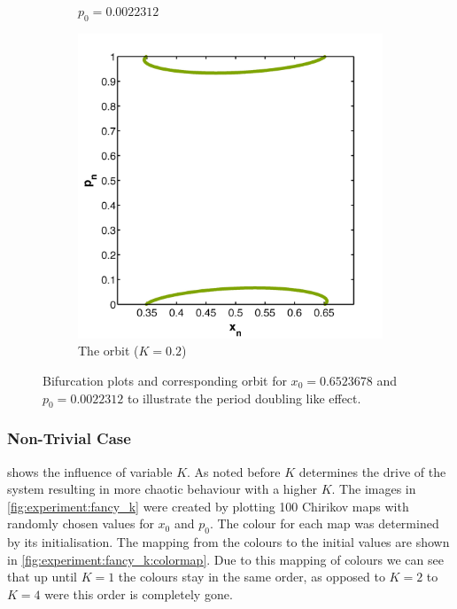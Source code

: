 \begin{figure}[ht]
\begin{subfigure}{0.32\textwidth}
			\caption{$p_0 = \num{0.0022312}$}
			\label{fig:experiment:bifurcation:p}
	\end{subfigure}
	\begin{subfigure}{0.32\textwidth}
		\centering
			\includegraphics[width=\textwidth]{./img/assignment_b_bfp_orbit}
			\caption{The orbit ($K = 0.2$)}
			\label{fig:experiment:bifurcation:orbit}
	\end{subfigure}
	\caption{Bifurcation plots and corresponding orbit for $x_0 = \num{0.6523678}$ and $p_0 = \num{0.0022312}$ to illustrate the period doubling like effect.}
	\label{fig:experiment:bifurcation}
\end{figure}

\subsubsection{Non-Trivial Case}
\label{ss:b:nontrivial}
 shows the influence of variable $K$. As noted before $K$ determines the drive of the system resulting in more chaotic behaviour with a higher $K$. The images in \cref{fig:experiment:fancy_k} were created by plotting 100 Chirikov maps with randomly chosen values for $x_0$ and $p_0$. The colour for each map was determined by its initialisation. The mapping from the colours to the initial values are shown in \cref{fig:experiment:fancy_k:colormap}. Due to this mapping of colours we can see that up until $K = 1$ the colours stay in the same order, as opposed to $K = 2$ to $K = 4$ were this order is completely gone.

